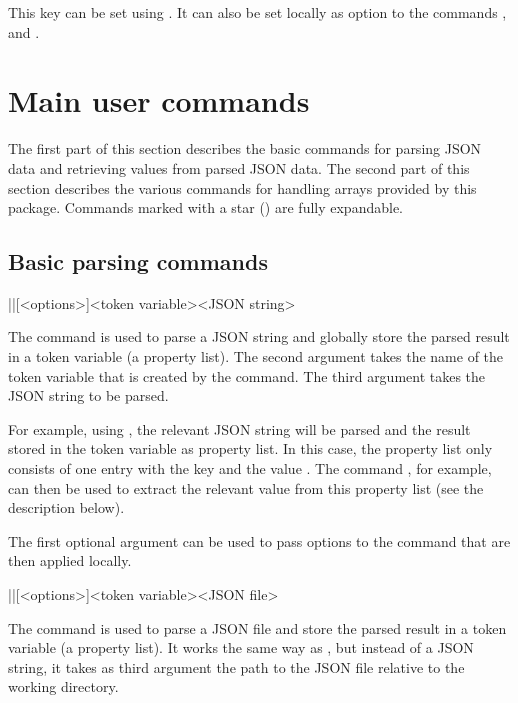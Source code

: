 \documentclass[a4paper]{article}
\begin{document}
{{This key can be set using \macro{\JSONParseSet}. It can also be set locally as option to the commands \macro{\JSONParseValue}, \macro{\JSONParseArrayUse} and \macro{\JSONParseArrayMapFunction}.

\section{Main user commands}

The first part of this section describes the basic commands for parsing JSON data and retrieving values from parsed JSON data. The second part of this section describes the various commands for handling arrays provided by this package. Commands marked with a star (\expandablestar) are fully expandable.

\subsection{Basic parsing commands}

\begin{macrodef}
|\JSONParse|[<options>]{<token variable>}{<JSON string>}
\end{macrodef}
The command \macro{\JSONParse} is used to parse a JSON string and globally store the parsed result in a token variable (a property list). The second argument takes the name of the token variable that is created by the command. The third argument takes the JSON string to be parsed.

For example, using , the relevant JSON string will be parsed and the result stored in the token variable \macro{\myJSONdata} as property list. In this case, the property list only consists of one entry with the key  and the value . The command , for example, can then be used to extract the relevant value from this property list (see the description below).

The first optional argument can be used to pass options to the command that are then applied locally.

\begin{macrodef}
|\JSONParseFromFile|[<options>]{<token variable>}{<JSON file>}
\end{macrodef}
The command \macro{\JSONParseFromFile} is used to parse a JSON file and store the parsed result in a token variable (a property list). It works the same way as \macro{\JSONParse}, but instead of a JSON string, it takes as third argument the path to the JSON file relative to the working directory.

}}
\end{document}
